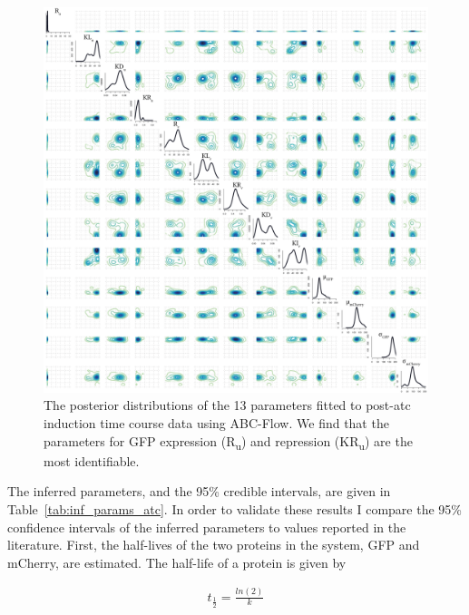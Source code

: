 \begin{figure}[tb]
\centerfloat
	\includegraphics[width=1.1\textwidth]{../../chapters/chapterABCFlow/images/posterior_atc.png}
	\caption[Posterior distribution of inferred parameters for post-\acrshort{atc} induction of the toggle switch]{\label{fig:1atc-post} The posterior distributions of the 13 parameters fitted to post-\acrshort{atc} induction time course data using ABC-Flow. We find that the parameters for GFP expression (R\textsubscript{u}) and repression (KR\textsubscript{u}) are the most identifiable.}
\end{figure}




The inferred parameters, and the 95\% credible intervals, are given in Table~\ref{tab:inf_params_atc}. In order to validate these results I compare the 95\% confidence intervals of the inferred parameters to values reported in the literature. First, the half-lives of the two proteins in the system, GFP and mCherry, are estimated. The half-life of a protein is given by 

\begin{align*}
	t_{\frac{1}{2}} = \frac{ln(2)}{k}
\end{align*}

